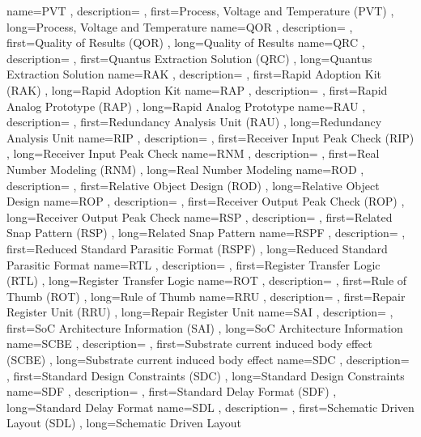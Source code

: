 { name={PVT}
, description={}
, first={Process, Voltage and Temperature (PVT)}
, long={Process, Voltage and Temperature}
}
{ name={QOR}
, description={}
, first={Quality of Results (QOR)}
, long={Quality of Results}
}
{ name={QRC}
, description={}
, first={Quantus Extraction Solution (QRC)}
, long={Quantus Extraction Solution}
}
{ name={RAK}
, description={}
, first={Rapid Adoption Kit (RAK)}
, long={Rapid Adoption Kit}
}
{ name={RAP}
, description={}
, first={Rapid Analog Prototype (RAP)}
, long={Rapid Analog Prototype}
}
{ name={RAU}
, description={}
, first={Redundancy Analysis Unit (RAU)}
, long={Redundancy Analysis Unit}
}
{ name={RIP}
, description={}
, first={Receiver Input Peak Check (RIP)}
, long={Receiver Input Peak Check}
}
{ name={RNM}
, description={}
, first={Real Number Modeling (RNM)}
, long={Real Number Modeling}
}
{ name={ROD}
, description={}
, first={Relative Object Design (ROD)}
, long={Relative Object Design}
}
{ name={ROP}
, description={}
, first={Receiver Output Peak Check (ROP)}
, long={Receiver Output Peak Check}
}
{ name={RSP}
, description={}
, first={Related Snap Pattern (RSP)}
, long={Related Snap Pattern}
}
{ name={RSPF}
, description={}
, first={Reduced Standard Parasitic Format (RSPF)}
, long={Reduced Standard Parasitic Format}
}
{ name={RTL}
, description={}
, first={Register Transfer Logic (RTL)}
, long={Register Transfer Logic}
}
{ name={ROT}
, description={}
, first={Rule of Thumb (ROT)}
, long={Rule of Thumb}
}
{ name={RRU}
, description={}
, first={Repair Register Unit (RRU)}
, long={Repair Register Unit}
}
{ name={SAI}
, description={}
, first={SoC Architecture Information (SAI)}
, long={SoC Architecture Information}
}
{ name={SCBE}
, description={}
, first={Substrate current induced body effect (SCBE)}
, long={Substrate current induced body effect}
}
{ name={SDC}
, description={}
, first={Standard Design Constraints (SDC)}
, long={Standard Design Constraints}
}
{ name={SDF}
, description={}
, first={Standard Delay Format (SDF)}
, long={Standard Delay Format}
}
{ name={SDL}
, description={}
, first={Schematic Driven Layout (SDL)}
, long={Schematic Driven Layout}
}
